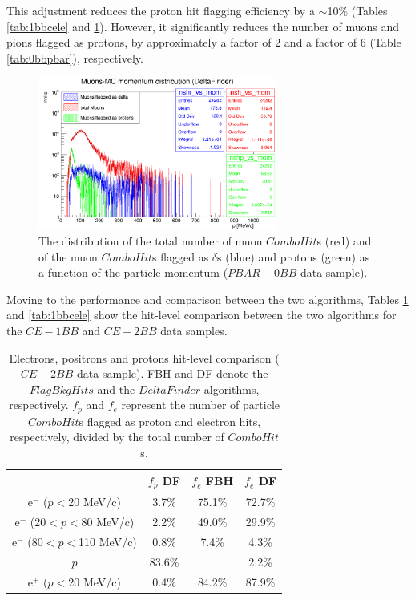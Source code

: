 This adjustment reduces the proton hit flagging  
efficiency by a $\sim$10\% 
(Tables \ref{tab:1bbcele} and \ref{tab:2bbcele}). 
However, it significantly reduces the 
number of muons and pions flagged as 
protons, by approximately 
a factor of 2 and a factor of 6 
(Table \ref{tab:0bbpbar}), respectively.

 \begin{figure}[!h]
            \centering
            \includegraphics[width =0.7\textwidth]{figures/png/Screenshot_20240805_222923.png}
        \caption[The  
        distribution of the total 
        and flagged number of muon 
        $ComboHit$s as a function of the particle momentum.]{The  
        distribution of the total number of 
        muon $ComboHit$s 
        (red) and of the muon $ComboHit$s 
        flagged as $\delta$s (blue) 
        and protons (green) as a function of the particle momentum ($PBAR-0BB$ data sample). }
           \label{fig:0pbarbefore}
\end{figure}

Moving to the performance and comparison 
between the two algorithms, Tables \ref{tab:2bbcele} and \ref{tab:1bbcele} 
show the hit-level comparison between the two algorithms 
for the $CE-1BB$ and $CE-2BB$ data samples.
\begin{center}
    \begin{table}[h!]
    \centering
    \renewcommand{\arraystretch}{1.}
    \begin{tabular}{| c | c | c | c |} 
    \hline
    &    $f_{p}$ DF & $f_{e}$ FBH  & $f_{e}$ DF \\
    \hline
    e$^-$ ($p<$20 MeV/c)      & 3.7\%   & 75.1\% & 72.7\%\\
    \hline
    e$^-$ (20$<p<$80 MeV/c)  & 2.2\%   & 49.0\%& 29.9\%\\
    \hline
    e$^-$ (80$<p<$110 MeV/c)  & 0.8\%  &  7.4\%& 4.3\%\\
    \hline
    $p$       &  83.6\%  &  & 2.2\%\\
    \hline
    e$^+$ ($p<$20 MeV/c) & 0.4\%    &   84.2\%& 87.9\%\\
    \hline
    \end{tabular}
    \caption{Electrons, 
    positrons and protons hit-level 
    comparison ($CE-2BB$ data sample). 
    FBH and DF denote  
    the $FlagBkgHits$ and the 
    $DeltaFinder$ algorithms, 
    respectively. $f_p$ and $f_e$ represent 
    the number of particle $ComboHit$s 
    flagged as proton and electron hits, respectively, 
    divided by the total number of $ComboHit$s.
    }\label{tab:2bbcele}
    \end{table}
    \end{center}

